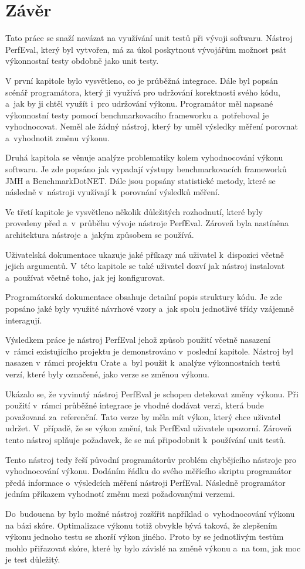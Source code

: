 \chapter{Závěr}

Tato práce se snaží navázat na využívání unit testů při vývoji softwaru.
Nástroj PerfEval, který byl vytvořen, má za úkol poskytnout vývojářům možnost
psát výkonnostní testy obdobně jako unit testy.

V první kapitole bylo vysvětleno, co je průběžná integrace. Dále byl popsán scénář programátora, který
ji využívá pro udržování korektnosti svého kódu, a~jak by ji chtěl využít i~pro udržování výkonu.
Programátor měl napsané výkonnostní testy pomocí benchmarkovacího frameworku a~potřeboval je vyhodnocovat.
Neměl ale žádný nástroj, který by uměl výsledky měření porovnat a~vyhodnotit změnu výkonu.

Druhá kapitola se věnuje analýze problematiky kolem vyhodnocování výkonu softwaru. Je zde popsáno jak vypadají výstupy benchmarkovacích frameworků
JMH a BenchmarkDotNET. Dále jsou popsány statistické metody, které se následně v~nástroji využívají k~porovnání
výsledků měření.

Ve třetí kapitole je vysvětleno několik důležitých rozhodnutí, které byly provedeny před a~v~průběhu vývoje nástroje PerfEval.
Zároveň byla nastíněna architektura nástroje a~jakým způsobem se používá.

Uživatelská dokumentace ukazuje jaké příkazy má uživatel k~dispozici včetně jejich argumentů.
V~této kapitole se také uživatel dozví jak nástroj instalovat a~používat včetně toho, jak jej konfigurovat.

Programátorská dokumentace obsahuje detailní popis struktury kódu. Je zde popsáno jaké byly využité návrhové vzory
a~jak spolu jednotlivé třídy vzájemně interagují.

Výsledkem práce je nástroj PerfEval jehož způsob použití včetně nasazení v~rámci existujícího projektu je demonstrováno
v~poslední kapitole. Nástroj byl nasazen v~rámci projektu Crate a~byl použit k~analýze výkonnostních testů verzí, které byly
označené, jako verze se změnou výkonu.

Ukázalo se, že vyvinutý nástroj PerfEval je schopen detekovat změny výkonu. Při použití v~rámci
průběžné integrace je vhodné dodávat verzi, která bude považovaná za~referenční. Tato verze by měla
mít výkon, který chce uživatel udržet. V~případě, že se výkon změní, tak PerfEval uživatele upozorní.
Zároveň tento nástroj splňuje požadavek, že se má připodobnit k~používání unit testů.

Tento nástroj tedy řeší původní programátorův problém chybějícího nástroje pro vyhodnocování výkonu.
Dodáním řádku do svého měřícího skriptu programátor předá informace o~výsledcích měření nástroji PerfEval.
Následně programátor jedním příkazem vyhodnotí změnu mezi požadovanými verzemi.

Do~budoucna by bylo možné nástroj rozšířit například o~vyhodnocování výkonu na bázi skóre.
Optimalizace výkonu totiž obvykle bývá taková, že zlepšením výkonu jednoho testu se zhorší výkon jiného.
Proto by se jednotlivým testům mohlo přiřazovat skóre, které by bylo závislé na změně výkonu a~na tom, jak moc je test důležitý.